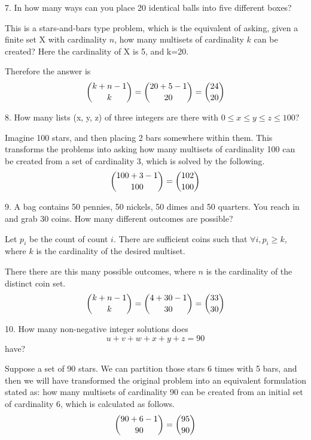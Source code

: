 \documentclass{hippoidC}
\begin{document}
\begin{prooflist}{7. In how many ways can you place 20 identical balls into five
		different boxes?}
	\item This is a stars-and-bars type problem, which is the equivalent of asking,
	given a finite set X with cardinality $n$, how many multisets of cardinality
	$k$ can be created? Here the cardinality of X is 5, and k=20.
	\item Therefore the answer is
	$$ \dbinom{k+n-1}{k} = \dbinom{20+5-1}{20}=\dbinom{24}{20}$$
\end{prooflist}

\begin{prooflist}{8. How many lists (x, y, z) of three integers are there with
		$0 \leq x \leq y \leq z \leq 100$?}
	\item  Imagine 100 stars, and then placing 2 bars somewhere within them. This
	transforms the problems into asking how many multisets of cardinality 100
	can be created from a set of cardinality 3, which is solved by the
	following.
	$$ \dbinom{100+3-1}{100} = \dbinom{102}{100}$$
	\item
\end{prooflist}

\begin{prooflist}{9. A bag contains 50 pennies, 50 nickels, 50 dimes and 50 quarters. You reach in and grab 30 coins. How many different outcomes are possible?}
	\item Let $p_i$ be the count of count $i$. There are sufficient coins such that
	$\forall i, p_i\geq k$, where $k$ is the cardinality of the desired
	multiset.
	\item There there are this many possible outcomes, where $n$ is the cardinality
	of the distinct coin set.
	$$ \dbinom{k+n-1}{k} = \dbinom{4+30-1}{30}=\dbinom{33}{30}$$
\end{prooflist}

\begin{prooflist}{10. How many non-negative integer solutions does $$u + v+ w+ x+
			y+ z = 90$$ have?}
	\item Suppose a set of 90 stars.  We can partition those stars 6 times with 5
	bars, and then we will have transformed the original problem into an
	equivalent formulation stated as: how many multisets of cardinality 90 can
	be created from an initial set of cardinality 6, which is calculated as
	follows.
	$$ \dbinom{90+6-1}{90} = \dbinom{95}{90}$$
\end{prooflist}
\end{document}
